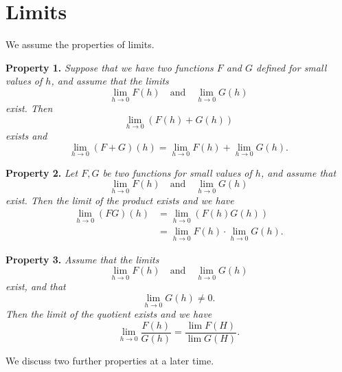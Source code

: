 \section*{Limits}

We assume the properties of limits.

\textbf{Property 1.} \textit{Suppose that we have two functions $F$ and $G$ defined for small values of $h$, and
  assume that the limits
  \[\lim_{h\to0}F(h) \quad \text{and} \quad \lim_{h\to0}G(h)\]
  exist. Then
  \[\lim_{h\to0}(F(h) + G(h))\]
  exists and
  \[\lim_{h\to0}(F + G)(h) = \lim_{h\to0}F(h) + \lim_{h\to0}G(h).\]}

\textbf{Property 2.} \textit{Let $F, G$ be two functions for small values of $h$, and assume that
  \[\lim_{h\to0}F(h) \quad \text{and} \quad \lim_{h\to0}G(h)\]
  exist. Then the limit of the product exists and we have
  \begin{align*}
    \lim_{h\to0}(FG)(h) &= \lim_{h\to0}(F(h)G(h))\\
    &= \lim_{h\to0}F(h) \cdot \lim_{h\to0}G(h).
  \end{align*}}

\textbf{Property 3.} \textit{Assume that the limits
  \[\lim_{h\to0}F(h) \quad \text{and} \quad \lim_{h\to0}G(h)\]
  exist, and that
  \[\lim_{h\to0}G(h) \ne 0.\]
  Then the limit of the quotient exists and we have
  \[\lim_{h\to0} \frac{F(h)}{G(h)} = \frac{\lim F(H)}{\lim G(H)}.\]}

We discuss two further properties at a later time.
